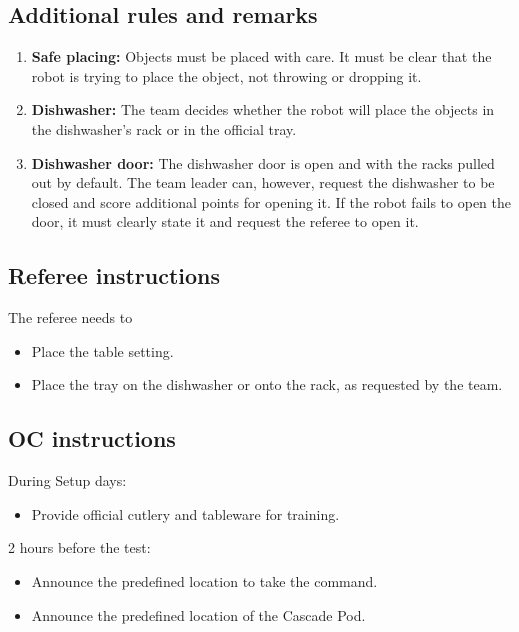 \subsection{Additional rules and remarks}
\begin{enumerate}[nosep]
	\item \textbf{Safe placing:} Objects must be placed with care. It must be clear that the robot is trying to place the object, not throwing or dropping it.

	\item \textbf{Dishwasher:} The team decides whether the robot will place the objects in the dishwasher's rack or in the official tray.

	\item \textbf{Dishwasher door:} The dishwasher door is open and with the racks pulled out by default.
	The team leader can, however, request the dishwasher to be closed and score additional points for opening it. If the robot fails to open the door, it must clearly state it and request the referee to open it.

\end{enumerate}

\subsection{Referee instructions}

The referee needs to
\begin{itemize}
	\item Place the table setting.
	\item Place the tray on the dishwasher or onto the rack, as requested by the team.
\end{itemize}

\subsection{OC instructions}
During Setup days:
\begin{itemize}
	\item Provide official cutlery and tableware for training.
\end{itemize}

2 hours before the test:
\begin{itemize}
	\item Announce the predefined location to take the command.
	\item Announce the predefined location of the Cascade Pod.
\end{itemize}

% 


